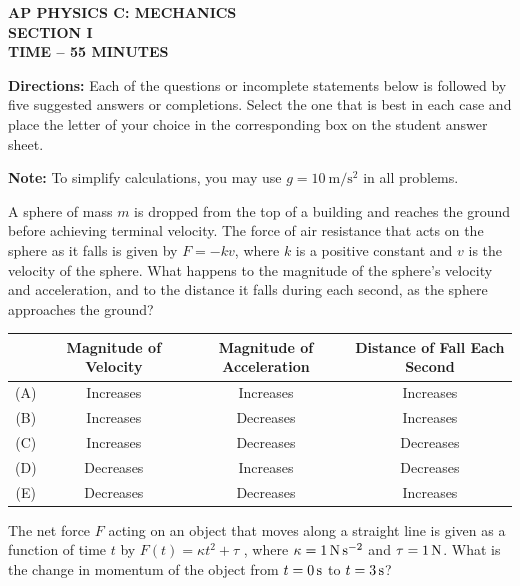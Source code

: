 \documentclass[12pt]{../../oss-apphys-exam}
\begin{document}
\begin{center}
  {
    \Large
    \textbf{AP PHYSICS C: MECHANICS\\SECTION I\\TIME -- 55 MINUTES}
  }
\end{center}

\textbf{Directions:} Each of the questions or incomplete statements below is
followed by five suggested answers or completions. Select the one that is best
in each case and place the letter of your choice in the corresponding box on
the student answer sheet.

\vspace{.2in}\textbf{Note:} To simplify calculations, you may use
$g=\SI{10}{\metre\per\second\squared}$ in all problems.

\begin{questions}

  \question A sphere of mass $m$ is dropped from the top of a building and
  reaches the ground before achieving terminal velocity. The force of air
  resistance that acts on the sphere as it falls is given by $F=-kv$, where
  $k$ is a positive constant and $v$ is the velocity of the sphere. What
  happens to the magnitude of the sphere's velocity and acceleration, and to
  the distance it falls during each second, as the sphere approaches the ground?
  
  \begin{tabular}{cccc}
    & \textbf{Magnitude of Velocity}
    & \textbf{Magnitude of Acceleration}
    & \textbf{Distance of Fall Each Second}\\ \hline
    (A) & Increases & Increases & Increases\\
    (B) & Increases & Decreases & Increases\\
    (C) & Increases & Decreases & Decreases\\
    (D) & Decreases & Increases & Decreases\\
    (E) & Decreases & Decreases & Increases
  \end{tabular}
  \newpage
  
  \question The net force $F$ acting on an object that moves along a straight
  line is given as a function of time $t$ by $F(t)=\kappa t^2 +\tau$ , where
  $\kappa=\SI1{\newton\per\second\squared}$ and $\tau =\SI1\newton$. What is
  the change in momentum of the object from $t=\SI0\second$ to $t=\SI3\second$?
  \newpage
  

\end{questions}
\end{document}
